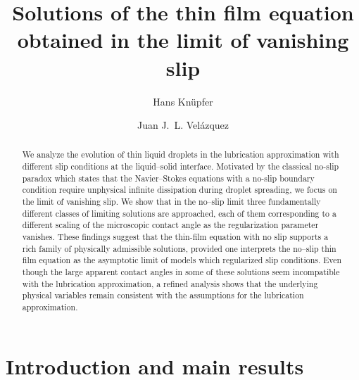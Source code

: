 \documentclass[pagesize,pdftex]{amsart}
\title{Solutions of the thin film equation obtained in the limit of vanishing slip}
\author{Hans Knüpfer}
\author{Juan J.~L. Velázquez}
\newcommand{\OO}{{\mathcal O}}
\newcommand{\eps}{\epsilon}
\begin{document}
\begin{abstract}
  We analyze the evolution of thin liquid droplets in the lubrication
  approximation with different slip conditions at the liquid--solid
  interface. Motivated by the classical no-slip paradox which states that the
  Navier–Stokes equations with a no-slip boundary condition require unphysical
  infinite dissipation during droplet spreading, we focus on the limit of
  vanishing slip.  We show that in the no--slip limit three fundamentally
  different classes of limiting solutions are approached, each of them
  corresponding to a different scaling of the microscopic contact angle as the
  regularization parameter vanishes. These findings suggest that the thin-film
  equation with no slip supports a rich family of physically admissible
  solutions, provided one interprets the no--slip thin film equation as the
  asymptotic limit of models which regularized slip conditions. Even though the
  large apparent contact angles in some of these solutions seem incompatible
  with the lubrication approximation, a refined analysis shows that the
  underlying physical variables remain consistent with the assumptions for the
  lubrication approximation.
\end{abstract}
 
\renewcommand{\em}[1]{\textit{#1}}


\maketitle
\tableofcontents


\section{Introduction and main results}


\end{document}
